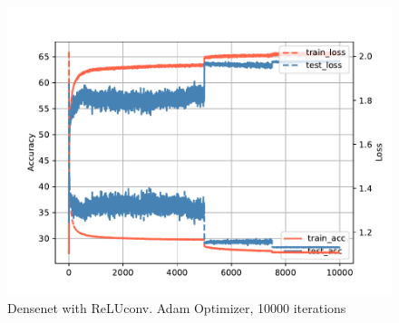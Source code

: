 \documentclass{article}
\begin{document}
\begin{figure}
        \centering
        \includegraphics[width=0.8\linewidth]{figures/10kAdam.pdf}
        \caption{Densenet with ReLUconv. Adam Optimizer, 10000 iterations}
\end{figure}
\end{document}

